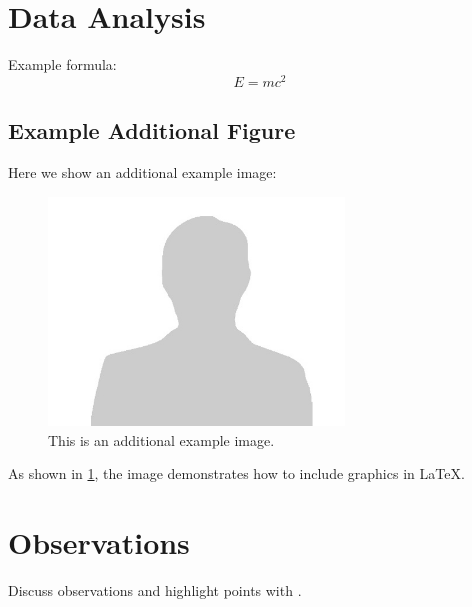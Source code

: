 \section{Data Analysis}
Example formula:
\[
E = mc^2
\]

\subsection{Example Additional Figure}
Here we show an additional example image:

\begin{figure}[h!]
    \centering
    \includegraphics[width=0.7\textwidth]{images/example-image.png}
    \caption{This is an additional example image.}
    \label{fig:example2}
\end{figure}

As shown in \cref{fig:example2}, the image demonstrates how to include graphics in LaTeX.

\section{Observations}
Discuss observations and highlight points with .